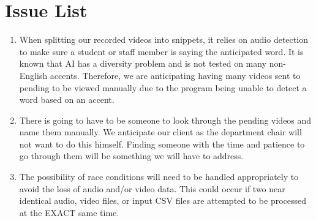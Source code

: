 \section{Issue List}
%
\begin{enumerate}
    \item When splitting our recorded videos into snippets, it relies on audio 
    detection to make sure a student or staff member is saying the anticipated 
    word. It is known that AI has a diversity problem and is not tested on many 
    non-English accents. Therefore, we are anticipating having many videos sent 
    to pending to be viewed manually due to the program being unable to detect a 
    word based on an accent.
    \item There is going to have to be someone to look through the pending videos 
    and name them manually. We anticipate our client as the department chair will 
    not want to do this himself. Finding someone with the time and patience to go 
    through them will be something we will have to address.
    \item The possibility of race conditions will need to be handled appropriately
    to avoid the loss of audio and/or video data. This could occur if two near identical
    audio, video files, or input CSV files are attempted to be processed at the EXACT same time.
\end{enumerate}
